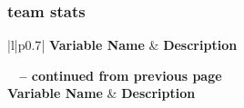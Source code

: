 \documentclass{article}
\begin{document}
\subsubsection{team stats}
\begin{longtable}{|l|p{0.7\linewidth}|}
\hline
\textbf{Variable Name} & \textbf{Description} \\
\hline
\endfirsthead

%
{{\bfseries \tablename\ \thetable{} -- continued from previous page}} \\
\hline
\textbf{Variable Name} & \textbf{Description} \\
\hline
\endhead

\hline {} \\ \hline
\endfoot

\hline \hline
\endlastfoot




\end{longtable}
\end{document}
